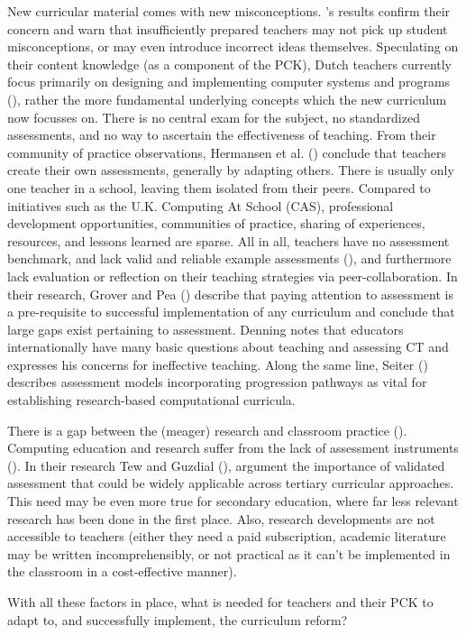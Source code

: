 New curricular material comes with new misconceptions. \cite{duncan2017teachers}'s results confirm their concern and warn that insufficiently prepared teachers may not pick up student misconceptions, or may even introduce incorrect ideas themselves. Speculating on their content knowledge (as a component of the PCK), Dutch teachers currently focus primarily on designing and implementing computer systems and programs (\cite{Schmidt2007}), rather the more fundamental underlying concepts which the new curriculum now focusses on. There is no central exam for the subject, no standardized assessments, and no way to ascertain the effectiveness of teaching. From their community of practice observations, Hermansen et al. (\cite{hermansen2014reworking}) conclude that teachers create their own assessments, generally by adapting others. There is usually only one teacher in a school, leaving them isolated from their peers. Compared to initiatives such as the U.K. Computing At School (CAS), professional development opportunities, communities of practice, sharing of experiences, resources, and lessons learned are sparse. All in all, teachers have no assessment benchmark, and lack valid and reliable example assessments (\cite{Yadav2015}), and furthermore lack evaluation or reflection on their teaching strategies via peer-collaboration. In their research, Grover and Pea (\cite{GroverPea2013}) describe that paying attention to assessment is a pre-requisite to successful implementation of any curriculum and conclude that large gaps exist pertaining to assessment. Denning \cite{denning2017remaining} notes that educators internationally have many basic questions about teaching and assessing CT and expresses his concerns for ineffective teaching. Along the same line, Seiter (\cite{2013Seiter}) describes assessment models incorporating progression pathways as vital for establishing research-based computational curricula.


There is a gap between the (meager) research and classroom practice (\cite{Yadav2015}).  Computing education and research suffer from the lack of assessment instruments (\cite{voogt2017effecten}). In their research Tew and Guzdial (\cite{2010TewGuzdial}), argument the importance of validated assessment that could be widely applicable across tertiary curricular approaches. This need may be even more true for secondary education, where far less relevant research has been done in the first place. Also, research developments are not accessible to teachers (either they need a paid subscription, academic literature may be written incomprehensibly, or not practical as it can't be implemented in the classroom in a cost-effective manner).

With all these factors in place, what is needed for teachers and their PCK to adapt to, and successfully implement, the curriculum reform?
